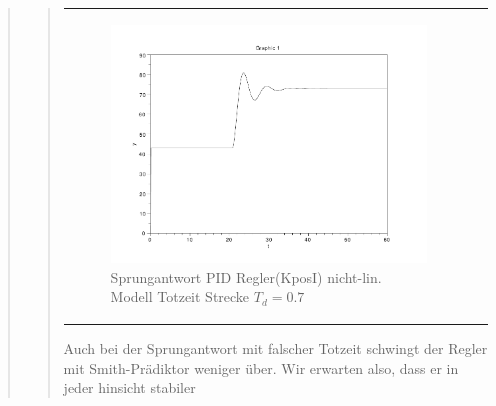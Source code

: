 \begin{quote}
\begin{quote}
\begin{center}
\begin{tabular}{ll}
                    \begin{minipage}{0.6\textwidth}
                        \begin{figure}[H]
                            \includegraphics[scale=0.4,trim = 0cm 0cm 0cm
                            0cm, clip]
                            {./Bilder/4_5_Td_04_KposI}
                              \caption{Sprungantwort PID Regler(KposI) nicht-lin. Modell Totzeit Strecke $T_d = 0.7$ }
                        \end{figure}
                    \end{minipage}
                
                \end{tabular}
            \end{center} 
        
        
        Auch bei der Sprungantwort mit falscher Totzeit schwingt der Regler mit Smith-Prädiktor weniger über. Wir
        erwarten also, dass er in jeder hinsicht stabiler
        
    \end{quote}
    
    
    
\end{quote}



